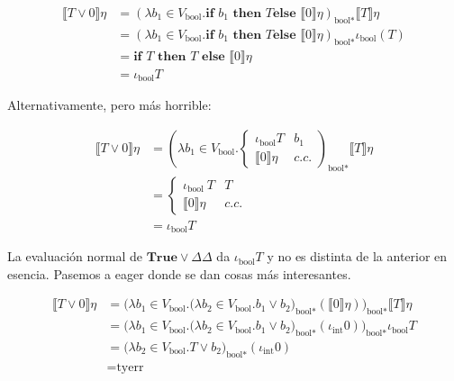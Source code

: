 \documentclass[article, 12pt]{article}
\begin{document}
\begin{align*}
\llbracket T \lor 0 \rrbracket\eta 
&=(\lambda b_1 \in V_{\text{bool}}. \textbf{if } b_1 \textbf{ then } T \textbf{
else } \llbracket 0 \rrbracket\eta )_{\text{bool}*} \llbracket T \rrbracket \eta
\\ 
&=(\lambda b_1 \in V_{\text{bool}}. \textbf{if } b_1 \textbf{ then } T \textbf{
else } \llbracket 0 \rrbracket\eta )_{\text{bool}*} \iota_{\text{bool}}(T) \\ 
&=\textbf{if } T \textbf{ then } T \textbf{ else } \llbracket 0 \rrbracket\eta
\\ 
&=\iota_{\text{bool}} T
\end{align*}

Alternativamente, pero más horrible:

\begin{align*}
\llbracket T \lor 0 \rrbracket\eta 
&=\left(\lambda b_1 \in V_{\text{bool}}. \begin{cases}
    \iota_{\text{bool}} T & b_1 \\ 
    \llbracket 0 \rrbracket\eta & c.c.
\end{cases}\right)_{\text{bool}*} \llbracket T \rrbracket \eta
\\ 
&= \begin{cases}
        \iota_{\text{bool}} ~ T & T  \\ 
        \llbracket 0 \rrbracket\eta & c.c.
\end{cases}  \\
&=\iota_{\text{bool}} T
\end{align*}

La evaluación normal de $\textbf{True} \lor  \Delta \Delta$  da
$\iota_{\text{bool}} T$ y no es distinta de la anterior en esencia. Pasemos a
eager donde se dan cosas más interesantes.


\begin{align*}
\llbracket T \lor 0 \rrbracket\eta
&= \Big(\lambda b_1 \in V_{\text{bool}}.\big( \lambda b_2 \in V_{\text{bool}}. b_1 \lor
b_2 \big)_{\text{bool}*}(\llbracket 0 \rrbracket\eta)
\Big)_{\text{bool}*}\llbracket T \rrbracket\eta \\ 
&= \Big(\lambda b_1 \in V_{\text{bool}}.\big( \lambda b_2 \in V_{\text{bool}}. b_1 \lor
    b_2 \big)_{\text{bool}*}(\iota_{\text{int}} 0)
\Big)_{\text{bool}*} \iota_{\text{bool}} T \\ 
&= \big( \lambda b_2 \in V_{\text{bool}}. T \lor
    b_2 \big)_{\text{bool}*}(\iota_{\text{int}} 0) \\ 
&= \text{tyerr}
\end{align*}
\end{document}
